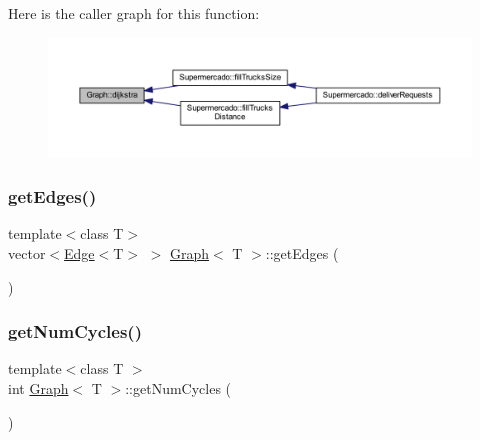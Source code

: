 Here is the caller graph for this function\+:
\nopagebreak
\begin{figure}[H]
\begin{center}
\leavevmode
\includegraphics[width=350pt]{class_graph_ad0319019c0883094c0d09841e88f2179_icgraph}
\end{center}
\end{figure}
\mbox{\label{class_graph_a92ccadde8c981252b715147a33b9dcb1}} 
\subsubsection{\texorpdfstring{get\+Edges()}{getEdges()}}
{\footnotesize\ttfamily template$<$class T$>$ \\
vector$<$\hyperlink{class_edge}{Edge}$<$T$>$ $>$ \hyperlink{class_graph}{Graph}$<$ T $>$\+::get\+Edges (\begin{DoxyParamCaption}{ }\end{DoxyParamCaption})\hspace{0.3cm}{\ttfamily [inline]}}

\mbox{\label{class_graph_a694dff81073c38b669057f0c6bd4cbb1}} 
\subsubsection{\texorpdfstring{get\+Num\+Cycles()}{getNumCycles()}}
{\footnotesize\ttfamily template$<$class T $>$ \\
int \hyperlink{class_graph}{Graph}$<$ T $>$\+::get\+Num\+Cycles (\begin{DoxyParamCaption}{ }\end{DoxyParamCaption})}

\mbox{\label{class_graph_a0853eac15cdf0f06d63f4b8a7820ec71}} 
